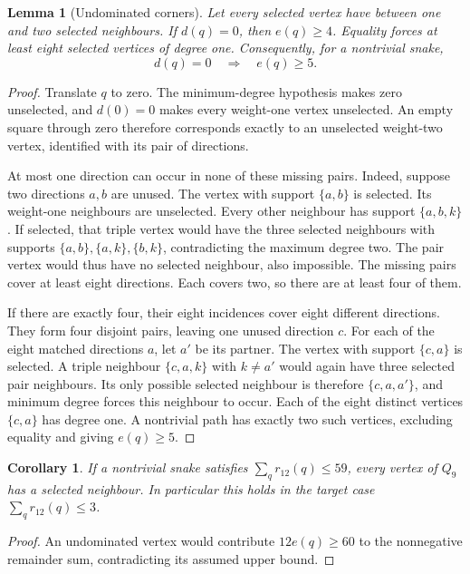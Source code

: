 \documentclass[11pt,a4paper]{article}
\newtheorem{lemma}[theorem]{Lemma}
\newtheorem{corollary}[theorem]{Corollary}
\theoremstyle{definition}
\theoremstyle{remark}
\newcommand{\Q}{Q}
\begin{document}
\begin{lemma}[Undominated corners]\label{lem:undominated-corners}
Let every selected vertex have between one and two selected neighbours.
If $d(q)=0$, then $e(q)\ge4$. Equality forces at least eight selected
vertices of degree one. Consequently, for a nontrivial snake,
\[
d(q)=0\quad\Longrightarrow\quad e(q)\ge5.
\]
\end{lemma}
\begin{proof}
Translate $q$ to zero. The minimum-degree hypothesis makes zero
unselected, and $d(0)=0$ makes every weight-one vertex unselected.
An empty square through zero therefore corresponds exactly to an
unselected weight-two vertex, identified with its pair of directions.

At most one direction can occur in none of these missing pairs.
Indeed, suppose two directions $a,b$ are unused. The vertex with support
$\{a,b\}$ is selected. Its weight-one neighbours are unselected.
Every other neighbour has support $\{a,b,k\}$. If selected, that triple
vertex would have the three selected neighbours with supports
$\{a,b\},\{a,k\},\{b,k\}$, contradicting the maximum degree two.
The pair vertex would thus have no selected neighbour, also impossible.
The missing pairs cover at least eight directions. Each covers two,
so there are at least four of them.

If there are exactly four, their eight incidences cover eight different
directions. They form four disjoint pairs, leaving one unused direction
$c$. For each of the eight matched directions $a$, let $a'$ be its partner.
The vertex with support $\{c,a\}$ is selected. A triple neighbour
$\{c,a,k\}$ with $k\ne a'$ would again have three selected pair neighbours.
Its only possible selected neighbour is therefore $\{c,a,a'\}$, and
minimum degree forces this neighbour to occur. Each of the eight distinct
vertices $\{c,a\}$ has degree one. A nontrivial path has exactly two such
vertices, excluding equality and giving $e(q)\ge5$.
\end{proof}

\begin{corollary}\label{cor:small-loss-domination}
If a nontrivial snake satisfies $\sum_qr_{12}(q)\le59$, every vertex of
$\Q_9$ has a selected neighbour. In particular this holds in the target
case $\sum_qr_{12}(q)\le3$.
\end{corollary}
\begin{proof}
An undominated vertex would contribute $12e(q)\ge60$ to the nonnegative
remainder sum, contradicting its assumed upper bound.
\end{proof}
\end{document}
